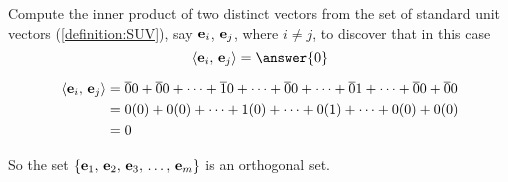 \documentclass{ximera}
\begin{document}
\begin{example}

Compute the inner product of two distinct vectors from the set of standard unit vectors (\ref{definition:SUV}), say $\mathbf{e}_i$, $\mathbf{e}_j$, where $i\neq j$, to discover that in this case
\[
  \innerproduct{\vect{e}_i}{\vect{e}_j}=\answer{0}
\]
\begin{hint}
\begin{align*}
  \left\langle\mathbf{e}_i,\,\mathbf{e}_j\right\rangle&=
                                         \overline{0}0+
                                         \overline{0}0+\cdots+
                                         \overline{1}0+\cdots+
                                         \overline{0}0+\cdots+
                                         \overline{0}1+\cdots+
                                         \overline{0}0+
                                         \overline{0}0\\
                                       &=0(0)+0(0)+\cdots+1(0)+\cdots+0(1)+\cdots+0(0)+0(0)\\
                                       &=0
\end{align*}
\end{hint}

So the set $\left\{\mathbf{e}_{1},\,\mathbf{e}_{2},\,\mathbf{e}_{3},\,\ldots,\,\mathbf{e}_{m}\right\}$ is an orthogonal set.
\end{example}
\end{document}
